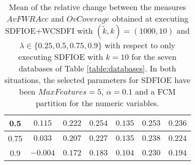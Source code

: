 \begin{table}[ht]
{{\begin{tabular}{|c|c|c|c|c|c|c|}
				\multicolumn{1}{|c|}{0.5}  & \multicolumn{1}{c|}{$0.115$}                & \multicolumn{1}{c|}{$0.222$} & \multicolumn{1}{c|}{$0.254$}                & \multicolumn{1}{c|}{$0.135$}                & \multicolumn{1}{c|}{$0.253$} &  $0.236$               \\ \hline
				\multicolumn{1}{|c|}{0.75}     & \multicolumn{1}{c|}{$0.033$}                & \multicolumn{1}{c|}{$0.207$}    & \multicolumn{1}{c|}{$0.227$}                & \multicolumn{1}{c|}{$0.135$}                & \multicolumn{1}{c|}{$0.238$}                &         $0.224$        \\ \hline
								\multicolumn{1}{|c|}{0.9}     & \multicolumn{1}{c|}{$-0.004$}                & \multicolumn{1}{c|}{$0.172$}    & \multicolumn{1}{c|}{$0.183$}                & \multicolumn{1}{c|}{$0.104$}                & \multicolumn{1}{c|}{$0.230$}                &         $0.194$        \\ \hline
			\end{tabular}
		}
	}
	
	\caption{Mean of the relative change between the measures $AvFWRAcc$ and $OvCoverage$ obtained at executing SDFIOE+WCSDFI with $(\tilde{k},k)=(1000,10)$ and $\lambda \in \{0.25,0.5,0.75,0.9\}$ with respect to only executing SDFIOE with $k=10$ for the seven databases of Table \ref{table:databases}. In both situations, the selected parameters for SDFIOE have been $MaxFeatures=5$, $\alpha=0.1$ and a FCM partition for the numeric variables.}\label{table:lambdas}
\end{table}

\newpage

